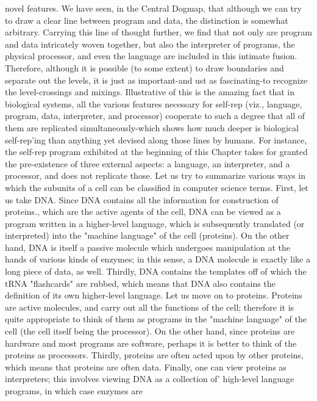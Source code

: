 {novel features. We have seen, in the Central Dogmap, that although we can try to draw a
clear line between program and data, the distinction is somewhat arbitrary. Carrying this line
of thought further, we find that not only are program and data intricately woven together, but
also the interpreter of programs, the physical processor, and even the language are included
in this intimate fusion. Therefore, although it is possible (to some extent) to draw boundaries
and separate out the levels, it is just as important-and ust as fascinating-to recognize the
level-crossings and mixings. Illustrative of this is the amazing fact that in biological systems,
all the various features necessary for self-rep (viz., language, program, data, interpreter, and
processor) cooperate to such a degree that all of them are replicated simultaneously-which
shows how much deeper is biological self-rep'ing than anything yet devised along those lines
by humans. For instance, the self-rep program exhibited at the beginning of this Chapter
takes for granted the pre-existence of three external aspects: a language, an interpreter, and a
processor, and does not replicate those.
         Let us try to summarize various ways in which the subunits of a cell can be classified
in computer science terms. First, let us take DNA. Since DNA contains all the information
for construction of proteins., which are the active agents of the cell, DNA can be viewed as a
program written in a higher-level language, which is subsequently translated (or interpreted)
into the "machine language" of the cell (proteins). On the other hand, DNA is itself a passive
molecule which undergoes manipulation at the hands of various kinds of enzymes; in this
sense, a DNA molecule is exactly like a long piece of data, as well. Thirdly, DNA contains
the templates off of which the tRNA "flashcards" are rubbed, which means that DNA also
contains the definition of its own higher-level language.
         Let us move on to proteins. Proteins are active molecules, and carry out all the
functions of the cell; therefore it is quite appropriate to think of them as programs in the
"machine language" of the cell (the cell itself being the processor). On the other hand, since
proteins are hardware and most programs are software, perhaps it is better to think of the
proteins as processors. Thirdly, proteins are often acted upon by other proteins, which means
that proteins are often data. Finally, one can view proteins as interpreters; this involves
viewing DNA as a collection of' high-level language programs, in which case enzymes are
}
